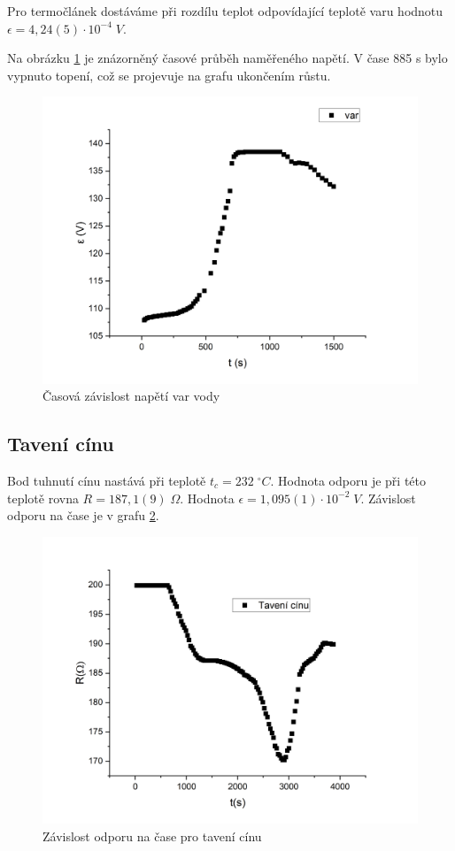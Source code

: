 Pro termočlánek dostáváme při rozdílu teplot odpovídající teplotě varu hodnotu $\epsilon = 4,24(5) \cdot 10^{-4} \; V$.

Na obrázku \ref{fig:napeti-na-case-var} je znázorněný časové průběh naměřeného napětí. V čase 885 s bylo vypnuto topení, což se projevuje na grafu ukončením růstu.

\begin{figure}[h]
    \centering
    \includegraphics[width=0.5\linewidth]{8 - Kalibrace odporového teploměru a termočlánku//Prototkol - kalibrace teploměru//img/Závislost epsilon na čase, var.png}
    \caption{Časová závislost napětí var vody}
    \label{fig:napeti-na-case-var}
\end{figure}

\newpage
\subsection{Tavení cínu}

Bod tuhnutí cínu nastává při teplotě $t_c = 232 \; ^\circ C$. Hodnota odporu je při této teplotě rovna $R = 187,1(9) \; \Omega$. Hodnota $\epsilon = 1,095(1) \cdot 10^{-2} \; V$. Závislost odporu na čase je v grafu \ref{fig:odpor-na-teplote-cin}.

\begin{figure}[h]
    \centering
    \includegraphics[width=0.5\linewidth]{8 - Kalibrace odporového teploměru a termočlánku//Prototkol - kalibrace teploměru//img/Závislost R na t, tavení cínu.png}
    \caption{Závislost odporu na čase pro tavení cínu}
    \label{fig:odpor-na-teplote-cin}
\end{figure}

